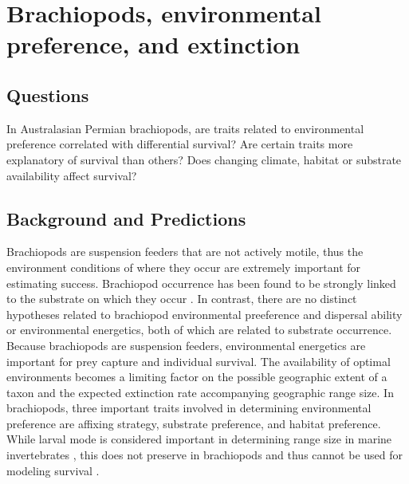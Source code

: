 \documentclass[12pt,letterpaper]{article}
\begin{document}
\section{Brachiopods, environmental preference, and extinction}

\subsection{Questions} In Australasian Permian brachiopods, are traits related to environmental preference correlated with differential survival? Are certain traits more explanatory of survival than others? Does changing climate, habitat or substrate availability affect survival?

\subsection{Background and Predictions}
Brachiopods are suspension feeders that are not actively motile, thus the environment conditions of where they occur are extremely important for estimating success. Brachiopod occurrence has been found to be strongly linked to the substrate on which they occur \citep{Richardson1997,Richardson1997a}. In contrast, there are no distinct hypotheses related to brachiopod environmental preeference and dispersal ability or environmental energetics, both of which are related to substrate occurrence. Because brachiopods are suspension feeders, environmental energetics are important for prey capture and individual survival. The availability of optimal environments becomes a limiting factor on the possible geographic extent of a taxon and the expected extinction rate accompanying geographic range size. In brachiopods, three important traits involved in determining environmental preference are affixing strategy, substrate preference, and habitat preference. While larval mode is considered important in determining range size in marine invertebrates \citep{Jablonski2006a,Jablonski1983}, this does not preserve in brachiopods and thus cannot be used for modeling survival \citep{Jablonski1983}. 
\end{document}
